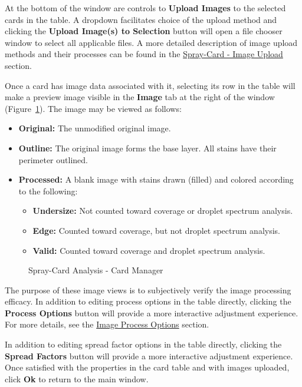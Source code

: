 \documentclass[10pt,letterpaper,titlepage]{article}
\begin{document}
    At the bottom of the window are controls to \textbf{Upload Images} to the selected cards in the table. A dropdown facilitates choice of the upload method and clicking the \textbf{Upload Image(s) to Selection} button will open a file chooser window to select all applicable files. A more detailed description of image upload methods and their processes can be found in the \hyperref[sec:image_upload]{Spray-Card - Image Upload} section.\par
    Once a card has image data associated with it, selecting its row in the table will make a preview image visible in the \textbf{Image} tab at the right of the window (Figure~\ref{fig:card_manager_image}). The image may be viewed as follows:
    \begin{itemize}
        \item \textbf{Original:} The unmodified original image.
        \item \textbf{Outline:} The original image forms the base layer. All stains have their perimeter outlined.
        \item \textbf{Processed:} A blank image with stains drawn (filled) and colored according to the following:
        \begin{itemize}
            \item \textbf{Undersize:} Not counted toward coverage or droplet spectrum analysis.
            \item \textbf{Edge:} Counted toward coverage, but not droplet spectrum analysis.
            \item \textbf{Valid:} Counted toward coverage and droplet spectrum analysis.
        \end{itemize}
    \end{itemize}
    \begin{figure}[hb]
        \centering
        \caption{Spray-Card Analysis - Card Manager}
        \label{fig:card_manager_image}
    \end{figure}
    The purpose of these image views is to subjectively verify the image processing efficacy. In addition to editing process options in the table directly, clicking the \textbf{Process Options} button will provide a more interactive adjustment experience. For more details, see the \hyperref[sec:image_process]{Image Process Options} section.\par
    In addition to editing spread factor options in the table directly, clicking the \textbf{Spread Factors} button will provide a more interactive adjustment experience.
    Once satisfied with the properties in the card table and with images uploaded, click \textbf{Ok} to return to the main window.
    \FloatBarrier
    \newpage
\end{document}
